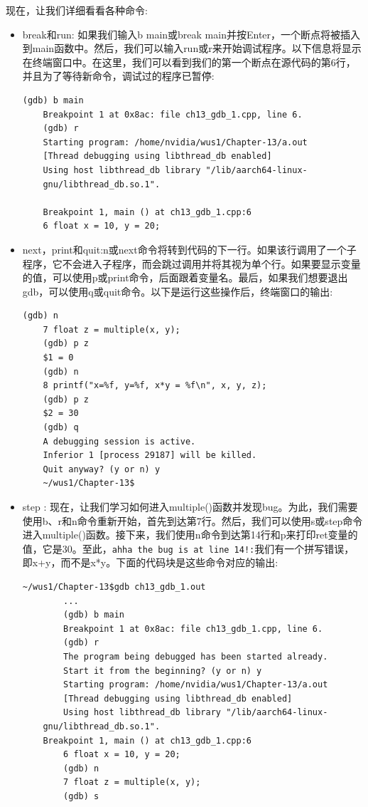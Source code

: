现在，让我们详细看看各种命令: \par
\begin{itemize}
	\item break和run: 如果我们输入b main或break main并按Enter，一个断点将被插入到main函数中。然后，我们可以输入run或r来开始调试程序。以下信息将显示在终端窗口中。在这里，我们可以看到我们的第一个断点在源代码的第6行，并且为了等待新命令，调试过的程序已暂停:
	\begin{lstlisting}[caption={}]
	(gdb) b main
	Breakpoint 1 at 0x8ac: file ch13_gdb_1.cpp, line 6.
	(gdb) r
	Starting program: /home/nvidia/wus1/Chapter-13/a.out
	[Thread debugging using libthread_db enabled]
	Using host libthread_db library "/lib/aarch64-linux-
	gnu/libthread_db.so.1".
	
	Breakpoint 1, main () at ch13_gdb_1.cpp:6
	6 float x = 10, y = 20;
	\end{lstlisting}
	\item next，print和quit:n或next命令将转到代码的下一行。如果该行调用了一个子程序，它不会进入子程序，而会跳过调用并将其视为单个行。如果要显示变量的值，可以使用p或print命令，后面跟着变量名。最后，如果我们想要退出gdb，可以使用q或quit命令。以下是运行这些操作后，终端窗口的输出:
	\begin{lstlisting}[caption={}]
	(gdb) n
	7 float z = multiple(x, y);
	(gdb) p z
	$1 = 0
	(gdb) n
	8 printf("x=%f, y=%f, x*y = %f\n", x, y, z);
	(gdb) p z
	$2 = 30
	(gdb) q
	A debugging session is active.
	Inferior 1 [process 29187] will be killed.
	Quit anyway? (y or n) y
	~/wus1/Chapter-13$
	\end{lstlisting}
	\item step : 现在，让我们学习如何进入multiple()函数并发现bug。为此，我们需要使用b、r和n命令重新开始，首先到达第7行。然后，我们可以使用s或step命令进入multiple()函数。接下来，我们使用n命令到达第14行和p来打印ret变量的值，它是30。至此，\texttt{ahha the bug is at line 14!:}我们有一个拼写错误，即x+y，而不是x*y。下面的代码块是这些命令对应的输出:
	\begin{lstlisting}[caption={}]
	~/wus1/Chapter-13$gdb ch13_gdb_1.out
		...
		(gdb) b main
		Breakpoint 1 at 0x8ac: file ch13_gdb_1.cpp, line 6.
		(gdb) r
		The program being debugged has been started already.
		Start it from the beginning? (y or n) y
		Starting program: /home/nvidia/wus1/Chapter-13/a.out
		[Thread debugging using libthread_db enabled]
		Using host libthread_db library "/lib/aarch64-linux-
	gnu/libthread_db.so.1".
	Breakpoint 1, main () at ch13_gdb_1.cpp:6
		6 float x = 10, y = 20;
		(gdb) n
		7 float z = multiple(x, y);
		(gdb) s

\end{lstlisting}
\end{itemize}
